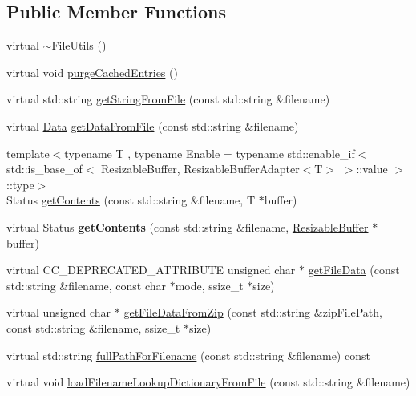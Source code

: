 \subsection*{Public Member Functions}
\begin{DoxyCompactItemize}
\item 
virtual \hyperlink{classFileUtils_a113a3a0ae84133a66408b20da027c0c7}{$\sim$\+File\+Utils} ()
\item 
virtual void \hyperlink{classFileUtils_a2a54bfc34349410e94c3b53e61bc026f}{purge\+Cached\+Entries} ()
\item 
virtual std\+::string \hyperlink{classFileUtils_a8e420b897f0e359c077976c31954e265}{get\+String\+From\+File} (const std\+::string \&filename)
\item 
virtual \hyperlink{classData}{Data} \hyperlink{classFileUtils_a0ed7a5e24b4f5d8643c6b3673cb6c46b}{get\+Data\+From\+File} (const std\+::string \&filename)
\item 
{\footnotesize template$<$typename T , typename Enable  = typename std\+::enable\+\_\+if$<$            std\+::is\+\_\+base\+\_\+of$<$ Resizable\+Buffer, Resizable\+Buffer\+Adapter$<$\+T$>$ $>$\+::value        $>$\+::type$>$ }\\Status \hyperlink{classFileUtils_a4e9cd9c1ab62bf30f42a423df06016b8}{get\+Contents} (const std\+::string \&filename, T $\ast$buffer)
\item 
\mbox{\label{classFileUtils_a07b60438d585e1076c9b9c151aa18724}} 
virtual Status {\bfseries get\+Contents} (const std\+::string \&filename, \hyperlink{classResizableBuffer}{Resizable\+Buffer} $\ast$buffer)
\item 
virtual C\+C\+\_\+\+D\+E\+P\+R\+E\+C\+A\+T\+E\+D\+\_\+\+A\+T\+T\+R\+I\+B\+U\+TE unsigned char $\ast$ \hyperlink{classFileUtils_ae261ba024555431d4ecc746ace25fdfe}{get\+File\+Data} (const std\+::string \&filename, const char $\ast$mode, ssize\+\_\+t $\ast$size)
\item 
virtual unsigned char $\ast$ \hyperlink{classFileUtils_a38a12ace92fad87bd225c225db7093d5}{get\+File\+Data\+From\+Zip} (const std\+::string \&zip\+File\+Path, const std\+::string \&filename, ssize\+\_\+t $\ast$size)
\item 
virtual std\+::string \hyperlink{classFileUtils_a678409294ab5f13195b109e503f6a1df}{full\+Path\+For\+Filename} (const std\+::string \&filename) const
\item 
virtual void \hyperlink{classFileUtils_a9886430fc0a8a3990379de3a04ebcd95}{load\+Filename\+Lookup\+Dictionary\+From\+File} (const std\+::string \&filename)

\end{DoxyCompactItemize}
